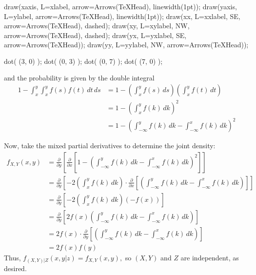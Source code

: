 \documentclass{article}
\begin{document}
\begin{enumerate}
\begin{enumerate}
\begin{enumerate}
\begin{soln}
\begin{center}
\begin{asy}
						draw(xaxis, L=xlabel, arrow=Arrows(TeXHead), linewidth(1pt));
						draw(yaxis, L=ylabel, arrow=Arrows(TeXHead), linewidth(1pt));
						draw(xx, L=xxlabel, SE, arrow=Arrows(TeXHead), dashed);
						draw(xy, L=xylabel, NW, arrow=Arrows(TeXHead), dashed);
						draw(yx, L=yxlabel, SE, arrow=Arrows(TeXHead));
						draw(yy, L=yylabel, NW, arrow=Arrows(TeXHead));

						dot( (3, 0) );
						dot( (0, 3) );
						dot( (0, 7) );
						dot( (7, 0) );
					\end{asy}
				\end{center}

				and the probability is given by the double integral 
			\begin{align*}
				1-\int_x^y \int_x^y f(s)f(t)\, dt\, ds &= 1-\left(\int_x^y f(s)\, ds\right)\left( \int_x^y f(t)\, dt \right) \\
				&= 1-\left( \int_x^y f(k)\, dk \right)^2 \\
				&= 1-\left( \int_{-\infty}^y f(k)\, dk - \int_{-\infty}^x f(k)\, dk \right)^2
			\end{align*}

			Now, take the mixed partial derivatives to determine the joint density:
			\begin{align*}
				f_{X, Y}(x, y) &= \frac{\partial}{\partial y}\left[\frac{\partial}{\partial x}\left[ 1-\left( \int_{-\infty}^y f(k)\, dk - \int_{-\infty}^x f(k)\, dk \right)^2 \right]\right] \\
				&= \frac{\partial}{\partial y}\left[-2\left(\int_x^y f(k)\, dk \right)\cdot \frac{\partial}{\partial x}\left[ \left( \int_{-\infty}^y f(k)\, dk - \int_{-\infty}^x f(k)\, dk \right) \right] \right] \\
				&= \frac{\partial}{\partial y}\left[ -2\left( \int_x^y f(k)\, dk \right)(-f(x)) \right] \\
				&= \frac{\partial}{\partial y}\left[ 2f(x) \left( \int_{-\infty}^y f(k)\, dk - \int_{-\infty}^x f(k)\, dk \right)\right] \\
				&= 2f(x)\cdot\frac{\partial}{\partial y}\left[ \left( \int_{-\infty}^y f(k)\, dk - \int_{-\infty}^x f(k)\, dk \right) \right] \\
				&= 2f(x) f(y)
			\end{align*}
			Thus, $f_{(X, Y)|Z}(x, y|z) = f_{X, Y}(x, y),$ so $(X, Y)$ and $Z$ are independent, as desired.

		\end{soln}


			\end{enumerate}


\end{enumerate}
\end{enumerate}
\end{document}
